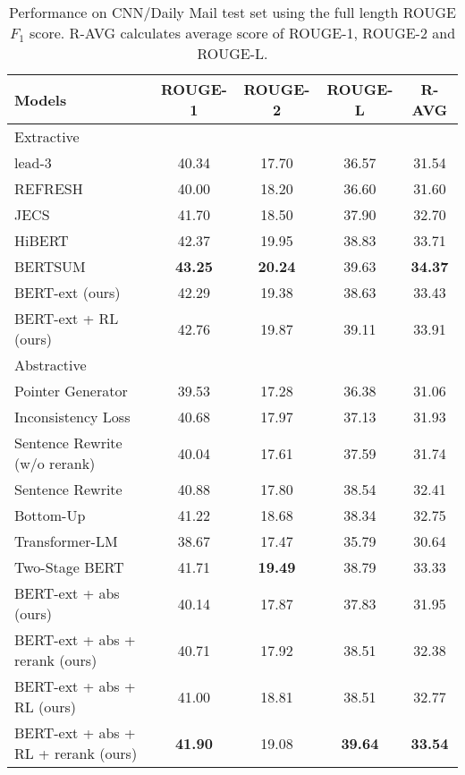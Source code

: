 \documentclass[11pt,a4paper]{article}
\begin{document}
\begin{table*}[t!]
\centering
\begin{adjustbox}{max width=\textwidth}
\begin{tabular}{l|ccc|c}
    \hline
    \bf Models & \bf ROUGE-1 & \bf ROUGE-2 & \bf ROUGE-L & \bf R-AVG \\
    \hline
    \multicolumn{5}{l}{Extractive} \\
    \hline
    lead-3 \cite{see-etal-2017-get} & 40.34 & 17.70 & 36.57 & 31.54 \\
    REFRESH \cite{narayan-etal-2018-ranking} & 40.00 & 18.20 & 36.60 & 31.60 \\
    JECS \cite{xu2019neural} & 41.70 & 18.50 & 37.90 & 32.70 \\
    HiBERT \cite{zhang-etal-2019-hibert} & 42.37 & 19.95 & 38.83 & 33.71 \\
    BERTSUM \cite{liu2019fine} & \bf 43.25 & \bf 20.24 & 39.63 & \bf 34.37 \\
    BERT-ext (ours) & 42.29 & 19.38 & 38.63 & 33.43 \\
    BERT-ext + RL (ours) & 42.76 & 19.87 & 39.11 & 33.91 \\
    \hline
    \multicolumn{5}{l}{Abstractive} \\
    \hline
    Pointer Generator \cite{see-etal-2017-get} & 39.53 & 17.28 & 36.38 & 31.06 \\
    Inconsistency Loss \cite{hsu-etal-2018-unified} & 40.68 & 17.97 & 37.13 & 31.93 \\
    Sentence Rewrite (w/o rerank) \cite{chen-bansal-2018-fast} & 40.04 & 17.61 & 37.59 & 31.74 \\
    Sentence Rewrite \cite{chen-bansal-2018-fast} & 40.88 & 17.80 & 38.54 & 32.41 \\
    Bottom-Up \cite{gehrmann-etal-2018-bottom} & 41.22 & 18.68 & 38.34 & 32.75 \\
    Transformer-LM \cite{hoang2019efficient} & 38.67 & 17.47 & 35.79 & 30.64 \\
    Two-Stage BERT \cite{zhang2019pretraining} & 41.71 & \bf 19.49 & 38.79 & 33.33 \\
    BERT-ext + abs (ours) & 40.14 & 17.87 & 37.83 & 31.95 \\
    BERT-ext + abs + rerank (ours) & 40.71 & 17.92 & 38.51 & 32.38 \\
    BERT-ext + abs + RL (ours) & 41.00 & 18.81 & 38.51 & 32.77 \\
    BERT-ext + abs + RL + rerank (ours) & \bf 41.90 & 19.08 & \bf 39.64 & \bf 33.54 \\
    \hline
\end{tabular}
\end{adjustbox}
\caption{\label{table:cnndm} Performance on CNN/Daily Mail test set using the full length ROUGE $F_1$ score. R-AVG calculates average score of ROUGE-1, ROUGE-2 and ROUGE-L.}
\end{table*}
\end{document}
